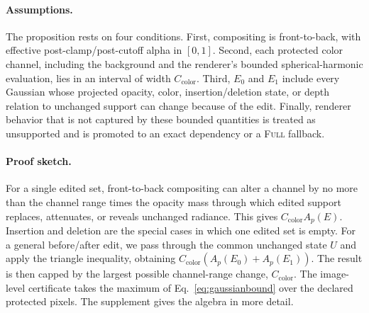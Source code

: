 \documentclass[acmtog,nonacm]{acmart}
\newcommand{\FULL}{\textsc{Full}}
\begin{document}
\paragraph{Assumptions.}
The proposition rests on four conditions. First, compositing is front-to-back, with effective post-clamp/post-cutoff alpha in $[0,1]$. Second, each protected color channel, including the background and the renderer's bounded spherical-harmonic evaluation, lies in an interval of width $C_{\mathrm{color}}$. Third, $E_0$ and $E_1$ include every Gaussian whose projected opacity, color, insertion/deletion state, or depth relation to unchanged support can change because of the edit. Finally, renderer behavior that is not captured by these bounded quantities is treated as unsupported and is promoted to an exact dependency or a \FULL{} fallback.

\paragraph{Proof sketch.}
For a single edited set, front-to-back compositing can alter a channel by no more than the channel range times the opacity mass through which edited support replaces, attenuates, or reveals unchanged radiance. This gives $C_{\mathrm{color}}A_p(E)$. Insertion and deletion are the special cases in which one edited set is empty. For a general before/after edit, we pass through the common unchanged state $U$ and apply the triangle inequality, obtaining $C_{\mathrm{color}}(A_p(E_0)+A_p(E_1))$. The result is then capped by the largest possible channel-range change, $C_{\mathrm{color}}$. The image-level certificate takes the maximum of Eq.~\ref{eq:gaussianbound} over the declared protected pixels. The supplement gives the algebra in more detail.
\end{document}
